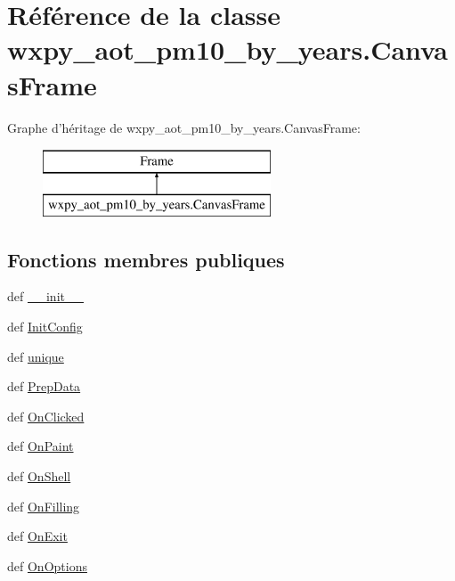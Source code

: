 \hypertarget{classwxpy__aot__pm10__by__years_1_1_canvas_frame}{\section{Référence de la classe wxpy\-\_\-aot\-\_\-pm10\-\_\-by\-\_\-years.\-Canvas\-Frame}
\label{classwxpy__aot__pm10__by__years_1_1_canvas_frame}
}
Graphe d'héritage de wxpy\-\_\-aot\-\_\-pm10\-\_\-by\-\_\-years.\-Canvas\-Frame\-:\begin{figure}[H]
\begin{center}
\leavevmode
\includegraphics[height=2.000000cm]{classwxpy__aot__pm10__by__years_1_1_canvas_frame}
\end{center}
\end{figure}
\subsection*{Fonctions membres publiques}
\begin{DoxyCompactItemize}
\item 
def \hyperlink{classwxpy__aot__pm10__by__years_1_1_canvas_frame_a4fadc42c5393da9736616bf289bba7ba}{\-\_\-\-\_\-init\-\_\-\-\_\-}
\item 
def \hyperlink{classwxpy__aot__pm10__by__years_1_1_canvas_frame_a7fb754f6cd5f7f2378b47c9e8ee94182}{Init\-Config}
\item 
def \hyperlink{classwxpy__aot__pm10__by__years_1_1_canvas_frame_a447c04b919876bf2bdb1e5d36757b574}{unique}
\item 
def \hyperlink{classwxpy__aot__pm10__by__years_1_1_canvas_frame_a6818fd4490498c9bd4864011ee1f74b8}{Prep\-Data}
\item 
def \hyperlink{classwxpy__aot__pm10__by__years_1_1_canvas_frame_a0dce44581c1fe2189deb16131c96bc92}{On\-Clicked}
\item 
def \hyperlink{classwxpy__aot__pm10__by__years_1_1_canvas_frame_ab08785b0b9a6e5746f66b176a04e37f3}{On\-Paint}
\item 
def \hyperlink{classwxpy__aot__pm10__by__years_1_1_canvas_frame_af26d9c13d57da71653971111777493be}{On\-Shell}
\item 
def \hyperlink{classwxpy__aot__pm10__by__years_1_1_canvas_frame_a208b24536707d450ed18dad6d0aefa09}{On\-Filling}
\item 
def \hyperlink{classwxpy__aot__pm10__by__years_1_1_canvas_frame_ace0afe2826dd3d115d3b7801d8b760f6}{On\-Exit}
\item 
def \hyperlink{classwxpy__aot__pm10__by__years_1_1_canvas_frame_a0672189a685aa7d5cf7b639deda6b072}{On\-Options}
\end{DoxyCompactItemize}
